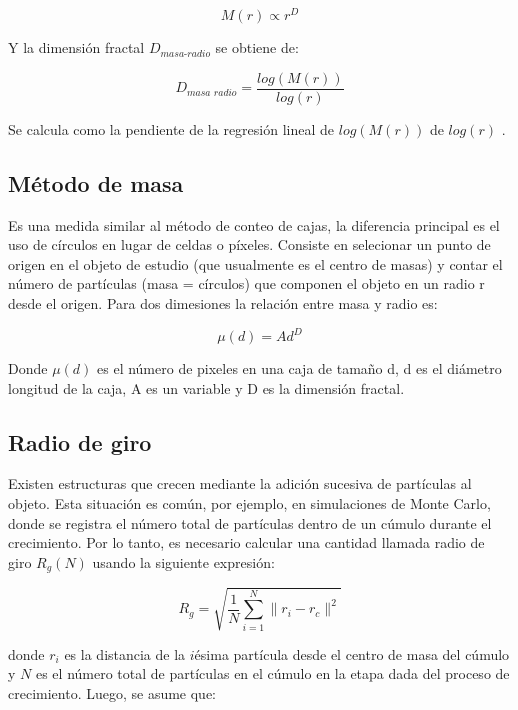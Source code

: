 \documentclass[11pt]{article}
\begin{document}
\begin{equation}
M(r) \propto r^{D} 
\end{equation}

Y la dimensi\'{o}n fractal $D_\textit{{masa-radio}}$ se obtiene de:

\begin{equation}
D_\textit{masa radio} = \frac{log (M(r))}{log (r)}
\end{equation}

Se calcula como la pendiente de la regresi\'{o}n lineal de $log(M(r))$ de $log(r)$ \cite{Mustafa1996}.


\subsection{M\'{e}todo de masa}

Es una medida similar al m\'{e}todo de conteo de cajas, la diferencia principal es el uso de c\'{i}rculos en lugar de celdas o p\'{i}xeles. Consiste en selecionar un punto de origen en el objeto de estudio (que usualmente es el centro de masas) y contar el n\'{u}mero de part\'{i}culas (masa = c\'{i}rculos) que componen 	el objeto en un radio r desde el origen. Para dos dimesiones la relaci\'{o}n entre masa y radio es:

\begin{equation}
\mu(d) = Ad^D
\end{equation}

Donde $\mu(d)$ es el n\'{u}mero de pixeles en una caja de tamaño d, d es el di\'{a}metro longitud de la caja, A es un variable y D es la dimensi\'{o}n fractal\cite{Mustafa1996}. 

\subsection{Radio de giro}

Existen estructuras que crecen mediante la adici\'{o}n sucesiva de part\'{i}culas al objeto. Esta situaci\'{o}n es com\'{u}n, por ejemplo, en simulaciones de Monte Carlo, donde se registra el n\'{u}mero total de part\'{i}culas dentro de un c\'{u}mulo durante el crecimiento. Por lo tanto, es necesario calcular una cantidad llamada radio de giro  \(R_g(N)\) usando la siguiente expresi\'{o}n:

\begin{equation}
R_g = \sqrt{\frac{1}{N} \sum_{i=1}^{N} \| r_i - r_c \|^2}
\end{equation}

donde \(r_i\) es la distancia de la \(i\)\'{e}sima part\'{i}cula desde el centro de masa del c\'{u}mulo y \(N\) es el n\'{u}mero total de part\'{i}culas en el c\'{u}mulo en la etapa dada del proceso de crecimiento. Luego, se asume que:
\end{document}
